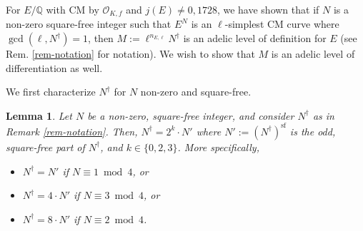 \documentclass[11pt]{amsart}
\newtheorem{corollary}[defn]{Corollary}
\newtheorem{lemma}[defn]{Lemma}
\theoremstyle{definition}
\newcommand{\Q}{\mathbb{Q}}
\newcommand{\Z}{\mathbb{Z}}
\newcommand{\Of}{\mathcal{O}_{K,f}}
\newcommand{\GL}{\operatorname{GL}}
\begin{document}
For $E/\Q$ with CM by $\Of$ and $j(E) \neq 0, 1728$, we have shown that if $N$ is a non-zero square-free integer such that $E^N$ is an $\ell$-simplest CM curve where $\gcd(\ell, N^\dagger) = 1$, then $M := \ell^{n_{E, \ell}} N^{\dagger}$ is an adelic level of definition for $E$ (see Rem. \ref{rem-notation} for notation). We wish to show that $M$ is an adelic level of differentiation as well.







We first characterize $N^{\dagger}$ for $N$ non-zero and square-free.

\begin{lemma}\label{lem-structureofN}
    Let $N$ be a non-zero, square-free integer, and consider $N^{\dagger}$ as in Remark \ref{rem-notation}. Then, $N^{\dagger} = 2^k \cdot N'$ where $N' := (N^{\dagger})^{\text{sf}}$ is the odd, square-free part of $N^{\dagger}$, and $k \in \{0, 2, 3\}$. More specifically,
    \begin{itemize}
        \item $N^{\dagger} = N'$ if $N \equiv 1 \bmod 4$, or
        \item $N^{\dagger} = 4 \cdot N'$ if $N \equiv 3 \bmod 4$, or
        \item $N^{\dagger} = 8 \cdot N'$ if $N \equiv 2 \bmod 4$.
    \end{itemize}
\end{lemma}
\end{document}
